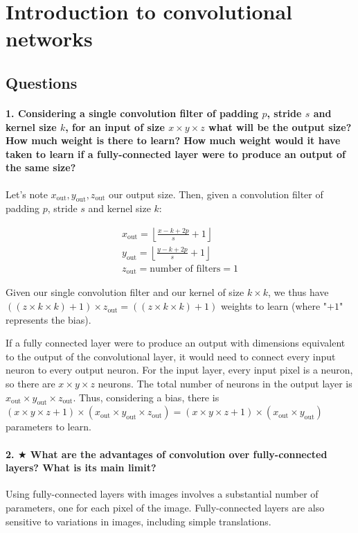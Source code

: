 \documentclass{article}
\theoremstyle{plain}%
\theoremstyle{definition}
\theoremstyle{remark}
\begin{document}
\newpage
\section{Introduction to convolutional networks}
\subsection{Questions}
\paragraph{1. Considering a single convolution filter of padding $p$, stride $s$ and kernel size $k$, for an input of size $x \times y \times z$ what will be the output size? How much weight is there to learn? How much weight would it have taken to learn if a fully-connected layer were to produce an output of the same size?}
Let's note $x_{\text{out}}, y_{\text{out}}, z_{\text{out}}$ our output size. Then, given a convolution filter of padding $p$, stride $s$ and kernel size $k$:

\begin{align}
    \label{eq:1} x_{\text{out}} = \left\lfloor\frac{x - k + 2p}{s} + 1 \right\rfloor \\
    \label{eq:2} y_{\text{out}} = \left\lfloor\frac{y - k + 2p}{s} + 1 \right\rfloor \\
    \label{eq:3} z_{\text{out}} = \text{number of filters} = 1
\end{align}

Given our single convolution filter and our kernel of size $ k \times k $, we thus have $ ((z \times k \times k) + 1) \times z_{\text{out}} = ((z \times k \times k) + 1) $ weights to learn (where "$+1$" represents the bias).

If a fully connected layer were to produce an output with dimensions equivalent to the output of the convolutional layer, it would need to connect every input neuron to every output neuron. For the input layer, every input pixel is a neuron, so there are \(x \times y \times z\) neurons. The total number of neurons in the output layer is \( x_{\text{out}} \times y_{\text{out}} \times z_{\text{out}} \). Thus, considering a bias, there is \((x \times y \times z + 1) \times (x_{\text{out}} \times y_{\text{out}} \times z_{\text{out}}) = (x \times y \times z + 1) \times (x_{\text{out}} \times y_{\text{out}}) \) parameters to learn.

\paragraph{2. $ \bigstar $ What are the advantages of convolution over fully-connected layers? What is its main limit?}
Using fully-connected layers with images involves a substantial number of parameters, one for each pixel of the image. Fully-connected layers are also sensitive to variations in images, including simple translations.
\end{document}
